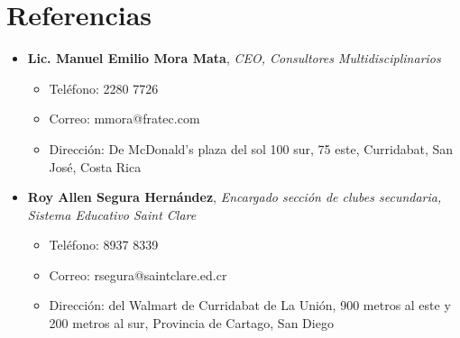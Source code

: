 \documentclass[11pt,a4paper,sans]{moderncv} %
\begin{document}



\section{Referencias}

\vspace{0.5cm}
{
\begin{itemize}
\item \textbf{Lic. Manuel Emilio Mora Mata}, \textit{CEO, Consultores Multidisciplinarios}
    \begin{itemize}
        \item Tel\'efono: 2280 7726
        \item Correo: mmora@fratec.com
        \item Direcci\'on: De McDonald's plaza del sol 100 sur, 75 este, Curridabat, San José, Costa Rica\\
    \end{itemize}
\item \textbf{Roy Allen Segura Hern\'andez}, \textit{Encargado secci\'on de clubes secundaria, Sistema Educativo Saint Clare}
\begin{itemize}
        \item Tel\'efono: 8937 8339
        \item Correo: rsegura@saintclare.ed.cr
        \item Direcci\'on: del Walmart de Curridabat de La Unión, 900 metros al este y 200 metros al sur, Provincia de Cartago, San Diego
    \end{itemize}
\end{itemize}
}







\end{document}
